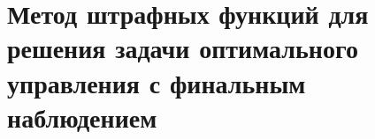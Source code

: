 \section{Метод штрафных функций для решения задачи
оптимального управления с финальным наблюдением}
\label{sec:ch3:sec3}

%
%

